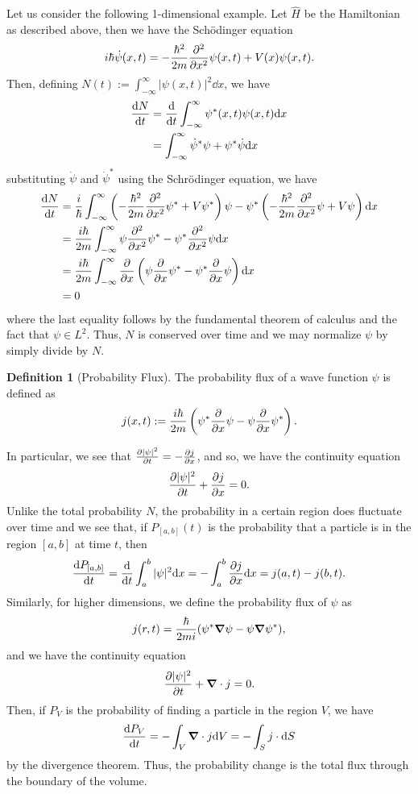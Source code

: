 \documentclass[]{article}
\theoremstyle{definition}
\theoremstyle{definition}
\newtheorem{definition}{Definition}[section]
\begin{document}
Let us consider the following 1-dimensional example. Let 
\(\hat H\) be the Hamiltonian as described above, then we have the Schödinger 
equation
\[i\hbar \dot \psi(x, t) = - \frac{\hbar^2}{2m} \pdv[2]{x} \psi(x, t) +
   V(x) \psi(x, t).\]
Then, defining \(N(t) := \int_{-\infty}^\infty |\psi(x, t)|^2 \dd x\), we have 
\[\begin{split}
  \dv{N}{t} & = \dv{t}\int_{-\infty}^\infty \psi^*(x, t) \psi(x, t) \dd x\\
  & = \int_{-\infty}^\infty \dot \psi^* \psi + \psi^* \dot \psi \dd x\\
\end{split}\]
substituting \(\dot \psi\) and \(\dot \psi^*\) using the Schrödinger equation, 
we have 
\[\begin{split}
  \dv{N}{t} & = \frac{i}{\hbar}\int_{-\infty}^\infty 
    \left(-\frac{\hbar^2}{2m}\pdv[2]{x} \psi^* + V \psi^*\right) \psi 
    - \psi^*\left(-\frac{\hbar^2}{2m}\pdv[2]{x}\psi + V \psi\right)\dd x\\
  & = \frac{i\hbar}{2m} \int_{-\infty}^\infty \psi \pdv[2]{x} \psi^* - 
    \psi^* \pdv[2]{x} \psi \dd x\\
  & = \frac{i\hbar}{2m} \int_{-\infty}^\infty \pdv{x}\left(
    \psi \pdv{x} \psi^* - \psi^* \pdv{x} \psi\right) \dd x\\
  & = 0
\end{split}\]
where the last equality follows by the fundamental theorem of calculus and 
the fact that \(\psi \in L^2\). Thus, \(N\) is conserved over time and we may 
normalize \(\psi\) by simply divide by \(N\).

\begin{definition}[Probability Flux]
  The probability flux of a wave function \(\psi\) is defined as 
  \[j(x, t) := \frac{i\hbar}{2m} \left(\psi^* \pdv{x} \psi -
    \psi \pdv{x} \psi^*\right).\]
\end{definition}
In particular, we see that \(\pdv{|\psi|^2}{t} = -\pdv{j}{x}\), and so, we have 
the continuity equation
\[\pdv{|\psi|^2}{t} + \pdv{j}{x} = 0.\]
Unlike the total probability \(N\), the probability in a certain region does 
fluctuate over time and we see that, if \(P_{[a, b]}(t)\) is the probability that 
a particle is in the region \([a, b]\) at time \(t\), then
\[\dv{P_{[a, b]}}{t} = \dv{t}\int_a^b |\psi|^2 \dd x = 
  -\int_a^b \pdv{j}{x} \dd x = j(a, t) - j(b, t).\]
Similarly, for higher dimensions, we define the probability flux of \(\psi\) as 
\[j(r, t) = \frac{\hbar}{2mi}(\psi^* \grad \psi - \psi \grad \psi^*),\]
and we have the continuity equation 
\[\pdv{|\psi|^2}{t} + \grad \cdot j = 0.\]
Then, if \(P_V\) is the probability of finding a particle in the region \(V\), 
we have 
\[\dv{P_V}{t} = - \int_V \grad \cdot j \dd V = - \int_S j \cdot \dd S\]
by the divergence theorem. Thus, the probability change is the total flux 
through the boundary of the volume.
\end{document}
